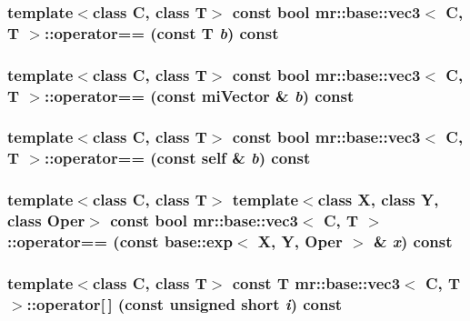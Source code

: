 \subsubsection{\setlength{\rightskip}{0pt plus 5cm}template$<$class C, class T$>$ const bool {\bf mr::base::vec3}$<$ C, T $>$::operator== (const T {\em b}) const\hspace{0.3cm}{\tt  [inline]}}\label{structmr_1_1base_1_1vec3_z37_3}


\subsubsection{\setlength{\rightskip}{0pt plus 5cm}template$<$class C, class T$>$ const bool {\bf mr::base::vec3}$<$ C, T $>$::operator== (const mi\-Vector \& {\em b}) const\hspace{0.3cm}{\tt  [inline]}}\label{structmr_1_1base_1_1vec3_z37_2}


\subsubsection{\setlength{\rightskip}{0pt plus 5cm}template$<$class C, class T$>$ const bool {\bf mr::base::vec3}$<$ C, T $>$::operator== (const {\bf self} \& {\em b}) const\hspace{0.3cm}{\tt  [inline]}}\label{structmr_1_1base_1_1vec3_z37_1}


\subsubsection{\setlength{\rightskip}{0pt plus 5cm}template$<$class C, class T$>$ template$<$class X, class Y, class Oper$>$ const bool {\bf mr::base::vec3}$<$ C, T $>$::operator== (const {\bf base::exp}$<$ X, Y, Oper $>$ \& {\em x}) const\hspace{0.3cm}{\tt  [inline]}}\label{structmr_1_1base_1_1vec3_z37_0}


\subsubsection{\setlength{\rightskip}{0pt plus 5cm}template$<$class C, class T$>$ const T {\bf mr::base::vec3}$<$ C, T $>$::operator[$\,$] (const unsigned short {\em i}) const\hspace{0.3cm}{\tt  [inline]}}\label{structmr_1_1base_1_1vec3_z35_1}


